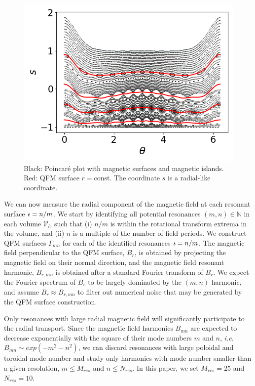 \documentclass[my_thesis.tex]{subfiles}
\begin{document}
\begin{figure}
	\centering
	\includegraphics[width=.75\linewidth]{images/QFMS_example.png}
	\caption{Black: Poincar\'e plot with magnetic surfaces and magnetic islands. Red: QFM surface $r=\text{const}$. The coordinate $s$ is a radial-like coordinate.}
	\label{fig.qfms_example}
\end{figure}

We can now measure the radial component of the magnetic field at each resonant surface $\text{$\iota\!\!$-}=n/m$. We start by identifying all potential resonances $(m,n)\in\mathbb{N}$ in each volume $\mathcal{V}_l$, such that (i) $n/m$ is within the rotational transform extrema in the volume, and (ii) $n$ is a multiple of the number of field periods. We construct QFM surfaces $\Gamma_{mn}$ for each of the identified resonances $\text{$\iota\!\!$-}=n/m$. The magnetic field perpendicular to the QFM surface, $ B_r$, is obtained by projecting  the magnetic field on their normal direction, and the magnetic field resonant harmonic, $ B_{r,mn}$ is obtained after a standard Fourier transform of $ B_r$. We expect the Fourier spectrum of $ B_r$ to be largely dominated by the $(m,n)$ harmonic, and assume $ B_r\approx B_{r,mn}$ to filter out numerical noise that may be generated by the QFM surface construction.

Only resonances with large radial magnetic field will significantly participate to the radial transport. Since the magnetic field harmonics $B_{mn}$ are expected to decrease exponentially with the square of their mode numbers $m$ and $n$, \textit{i.e.} $B_{mn}\sim exp(-m^2-n^2)$, we can discard resonances with large poloidal and toroidal mode number and study only harmonics with mode number smaller than a given resolution, $m\leq M_{res}$ and $n\leq N_{res}$. In this paper, we set $M_{res}=25$ and $N_{res}=10$. 
\end{document}

